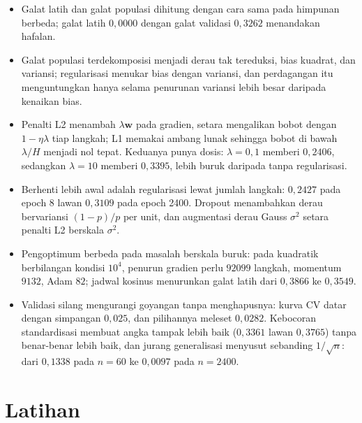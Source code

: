 \begin{ringkasan}
\begin{itemize}
  \item Galat latih dan galat populasi dihitung dengan cara sama pada himpunan berbeda;
        galat latih $0{,}0000$ dengan galat validasi $0{,}3262$ menandakan hafalan.
  \item Galat populasi terdekomposisi menjadi derau tak tereduksi, bias kuadrat, dan
        variansi; regularisasi menukar bias dengan variansi, dan perdagangan itu
        menguntungkan hanya selama penurunan variansi lebih besar daripada kenaikan bias.
  \item Penalti L2 menambah $\lambda\mathbf{w}$ pada gradien, setara mengalikan bobot
        dengan $1-\eta\lambda$ tiap langkah; L1 memakai ambang lunak sehingga bobot di
        bawah $\lambda/H$ menjadi nol tepat. Keduanya punya dosis: $\lambda=0{,}1$
        memberi $0{,}2406$, sedangkan $\lambda=10$ memberi $0{,}3395$, lebih buruk
        daripada tanpa regularisasi.
  \item Berhenti lebih awal adalah regularisasi lewat jumlah langkah: $0{,}2427$ pada
        epoch 8 lawan $0{,}3109$ pada epoch 2400. Dropout menambahkan derau bervariansi
        $(1-p)/p$ per unit, dan augmentasi derau Gauss $\sigma^2$ setara penalti L2
        berskala $\sigma^2$.
  \item Pengoptimum berbeda pada masalah berskala buruk: pada kuadratik berbilangan
        kondisi $10^4$, penurun gradien perlu $92099$ langkah, momentum $9132$, Adam
        $82$; jadwal kosinus menurunkan galat latih dari $0{,}3866$ ke $0{,}3549$.
  \item Validasi silang mengurangi goyangan tanpa menghapusnya: kurva CV datar dengan
        simpangan $0{,}025$, dan pilihannya meleset $0{,}0282$. Kebocoran standardisasi
        membuat angka tampak lebih baik ($0{,}3361$ lawan $0{,}3765$) tanpa benar-benar
        lebih baik, dan jurang generalisasi menyusut sebanding $1/\sqrt n$: dari
        $0{,}1338$ pada $n=60$ ke $0{,}0097$ pada $n=2400$.
\end{itemize}
\end{ringkasan}

\section{Latihan}

